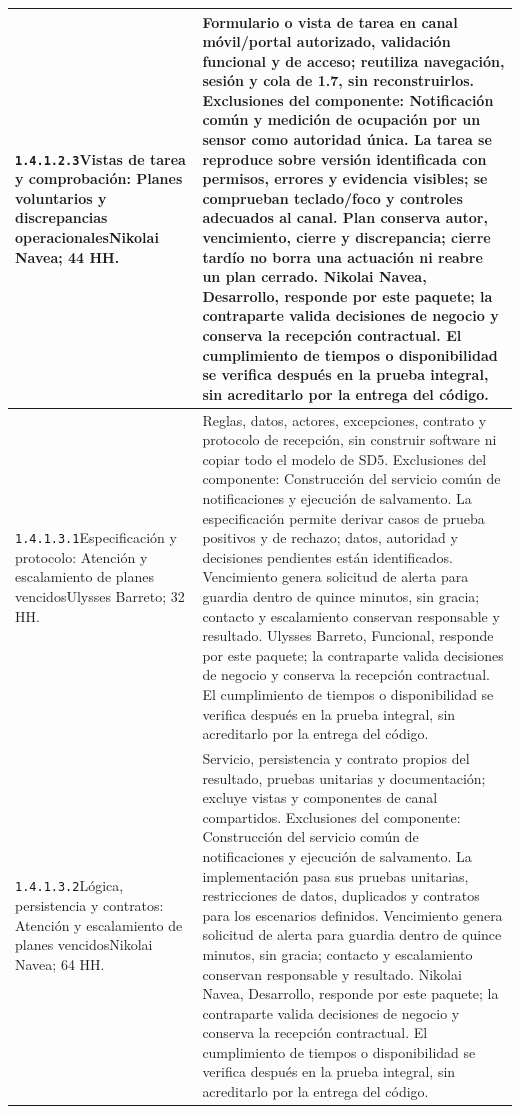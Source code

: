 \begin{longtable}{L{52mm}L{91mm}}
\texttt{1.\allowbreak{}4.\allowbreak{}1.\allowbreak{}2.\allowbreak{}3}\newline Vistas de tarea y comprobación: Planes voluntarios y discrepancias operacionales\newline Nikolai Navea; 44 HH. & Formulario o vista de tarea en canal móvil/portal autorizado, validación funcional y de acceso; reutiliza navegación, sesión y cola de 1.7, sin reconstruirlos. Exclusiones del componente: Notificación común y medición de ocupación por un sensor como autoridad única. La tarea se reproduce sobre versión identificada con permisos, errores y evidencia visibles; se comprueban teclado/foco y controles adecuados al canal. Plan conserva autor, vencimiento, cierre y discrepancia; cierre tardío no borra una actuación ni reabre un plan cerrado. Nikolai Navea, Desarrollo, responde por este paquete; la contraparte valida decisiones de negocio y conserva la recepción contractual. El cumplimiento de tiempos o disponibilidad se verifica después en la prueba integral, sin acreditarlo por la entrega del código.\\\hline
\texttt{1.\allowbreak{}4.\allowbreak{}1.\allowbreak{}3.\allowbreak{}1}\newline Especificación y protocolo: Atención y escalamiento de planes vencidos\newline Ulysses Barreto; 32 HH. & Reglas, datos, actores, excepciones, contrato y protocolo de recepción, sin construir software ni copiar todo el modelo de SD5. Exclusiones del componente: Construcción del servicio común de notificaciones y ejecución de salvamento. La especificación permite derivar casos de prueba positivos y de rechazo; datos, autoridad y decisiones pendientes están identificados. Vencimiento genera solicitud de alerta para guardia dentro de quince minutos, sin gracia; contacto y escalamiento conservan responsable y resultado. Ulysses Barreto, Funcional, responde por este paquete; la contraparte valida decisiones de negocio y conserva la recepción contractual. El cumplimiento de tiempos o disponibilidad se verifica después en la prueba integral, sin acreditarlo por la entrega del código.\\\hline
\texttt{1.\allowbreak{}4.\allowbreak{}1.\allowbreak{}3.\allowbreak{}2}\newline Lógica, persistencia y contratos: Atención y escalamiento de planes vencidos\newline Nikolai Navea; 64 HH. & Servicio, persistencia y contrato propios del resultado, pruebas unitarias y documentación; excluye vistas y componentes de canal compartidos. Exclusiones del componente: Construcción del servicio común de notificaciones y ejecución de salvamento. La implementación pasa sus pruebas unitarias, restricciones de datos, duplicados y contratos para los escenarios definidos. Vencimiento genera solicitud de alerta para guardia dentro de quince minutos, sin gracia; contacto y escalamiento conservan responsable y resultado. Nikolai Navea, Desarrollo, responde por este paquete; la contraparte valida decisiones de negocio y conserva la recepción contractual. El cumplimiento de tiempos o disponibilidad se verifica después en la prueba integral, sin acreditarlo por la entrega del código.\\\hline

\end{longtable}

